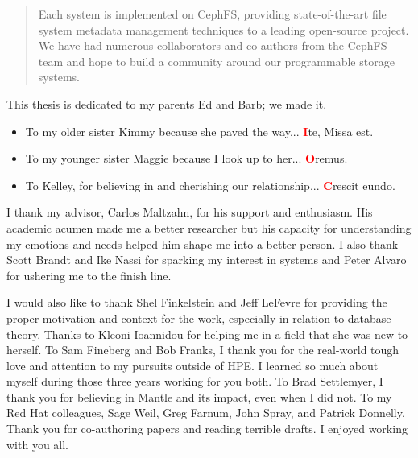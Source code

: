 \begin{frontmatter}
\begin{abstract}
Each system is implemented on CephFS, providing state-of-the-art file system
metadata management techniques to a leading open-source project. We have had
numerous collaborators and co-authors from the CephFS team and hope to build a
community around our programmable storage systems.

	\end{abstract}
	\begin{dedication}
                \vspace*{\fill}
                \noindent This thesis is dedicated to my parents Ed and Barb; we made it.
                \begin{itemize}
                  \item[] To my older sister Kimmy because she paved the way...  {\huge\textbf{\textcolor{red}{I}}}te, Missa est.
                  \item[] To my younger sister Maggie because I look up to her...  {\huge\textbf{\textcolor{red}{O}}}remus.
                  \item[] To Kelley, for believing in and cherishing our  relationship... {\huge\textbf{\textcolor{red}{C}}}rescit eundo.
                \end{itemize}
                \vspace*{\fill}
	\end{dedication}
	\begin{acknowledgements}

I thank my advisor, Carlos Maltzahn, for his support and enthusiasm. His
academic acumen made me a better researcher but his capacity for understanding
my emotions and needs helped him shape me into a better person. I also thank
Scott Brandt and Ike Nassi for sparking my interest in systems and Peter Alvaro
for ushering me to the finish line.

I would also like to thank Shel Finkelstein and Jeff LeFevre for providing the
proper motivation and context for the work, especially in relation to database
theory. Thanks to Kleoni Ioannidou for helping me in a field that she was new
to herself. To Sam Fineberg and Bob Franks, I thank you for the real-world
tough love and attention to my pursuits outside of HPE.  I learned so much
about myself during those three years working for you both. To Brad Settlemyer,
I thank you for believing in Mantle and its impact, even when I did not.  To my
Red Hat colleagues, Sage Weil, Greg Farnum, John Spray, and Patrick Donnelly.
Thank you for co-authoring papers and reading terrible drafts. I enjoyed
working with you all.


\end{acknowledgements}
\end{frontmatter}
